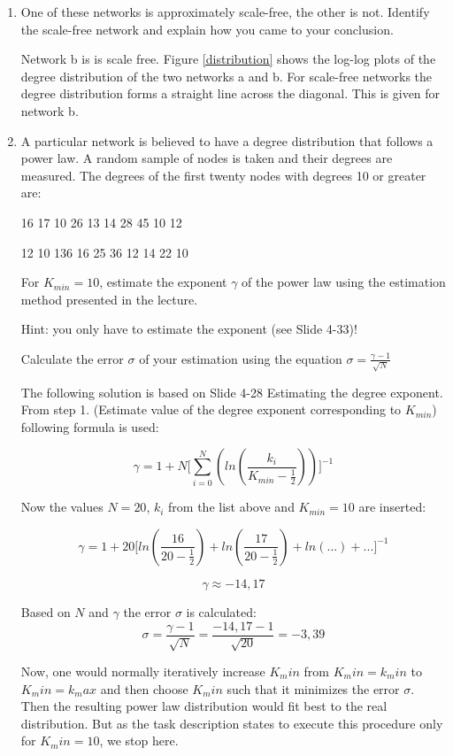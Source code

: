 \begin{enumerate}
	\item One of these networks is approximately scale-free, the other is not. Identify the scale-free network and explain how you came to your conclusion.
	
	Network b is is scale free. 
	Figure \ref{distribution} shows the log-log plots of the degree distribution of the two networks a and b. For scale-free networks the degree distribution forms a straight line across the diagonal. This is given for network b.
	
	\item A particular network is believed to have a degree distribution that follows a power law. A random sample of nodes is taken and their degrees are measured. The degrees of the first twenty nodes with degrees 10 or greater are: 
	
	16  17  10  26  13  14  28  45  10  12
	
	12  10  136  16  25  36  12  14  22  10
	
	For $K_{min} = 10$, estimate the exponent $\gamma$ of the power law using the estimation method presented in the lecture.
	
	Hint: you only have to estimate the exponent (see Slide 4-33)!
	
	Calculate the error $\sigma$ of your estimation using the equation $\sigma = \frac{\gamma - 1}{\sqrt{N}}$
	
	\vspace{0,75cm}
	The following solution is based on Slide 4-28 Estimating the degree exponent. From step 1. (Estimate value of the degree exponent corresponding to $K_{min}$) following formula is used:
	
	\begin{equation}
	\gamma = 1 + N \biggl[ \sum_{i=0}^N (ln(\frac{k_i}{K_{min} - \frac{1}{2}})) \biggr]^{-1}
	\end{equation}
	
	Now the values $N=20$, $k_i$ from the list above and $K_{min} = 10$ are inserted:
	
	\begin{equation*}
	\gamma = 1 + 20 \biggl[ ln(\frac{16}{20-\frac{1}{2}}) + ln(\frac{17}{20-\frac{1}{2}}) + ln(...) + ... \biggr]^{-1}
	\end{equation*}
	
	\begin{equation*}
	\gamma \approx -14,17
	\end{equation*}
	
	Based on $N$ and $\gamma$ the error $\sigma$ is calculated:
	\begin{equation*}
	\sigma = \frac{\gamma - 1}{\sqrt{N}} = \frac{-14,17 - 1}{\sqrt{20}} = -3,39
	\end{equation*}
	
	Now, one would normally iteratively increase $K_min$ from $K_min = k_min$ to $K_min = k_max$ and then choose $K_min$ such that it minimizes the error $\sigma$. Then the resulting power law distribution would fit best to the real distribution. But as the task description states to execute this procedure only for $K_min = 10$, we stop here.

\end{enumerate}